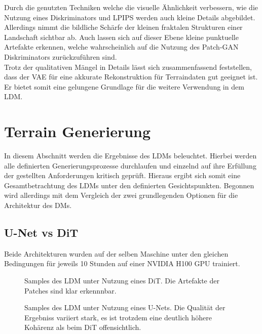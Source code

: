 Durch die genutzten Techniken welche die visuelle Ähnlichkeit verbessern, wie die Nutzung eines Diskriminators und LPIPS werden auch kleine Details abgebildet. Allerdings nimmt die bildliche Schärfe der kleinen fraktalen Strukturen einer Landschaft sichtbar ab. Auch lassen sich auf dieser Ebene kleine punktuelle Artefakte erkennen, welche wahrscheinlich auf die Nutzung des Patch-GAN Diskriminators zurückzuführen sind. \\
Trotz der qualitativen Mängel in Details lässt sich zusammenfassend feststellen, dass der VAE für eine akkurate Rekonstruktion für Terraindaten gut geeignet ist. Er bietet somit eine gelungene Grundlage für die weitere Verwendung in dem LDM.

\section {Terrain Generierung}

In diesem Abschnitt werden die Ergebnisse des LDMs beleuchtet. Hierbei werden alle definierten Generierungsprozesse durchlaufen und einzelnd auf ihre Erfüllung der gestellten Anforderungen kritisch geprüft. Hieraus ergibt sich somit eine Gesamtbetrachtung des LDMs unter den definierten Gesichtspunkten. Begonnen wird allerdings mit dem Vergleich der zwei grundlegenden Optionen für die Architektur des DMs. 


\subsection {U-Net vs DiT}

Beide Architekturen wurden auf der selben Maschine unter den gleichen Bedingungen für jeweils 10 Stunden auf einer NVIDIA H100 GPU trainiert. 

\begin{figure}[htbp]
    \centering
    \caption{Samples des LDM unter Nutzung eines DiT. Die Artefakte der Patches sind klar erkennnbar.}
    \label{fig:dit_results}
\end{figure}


\begin{figure}[htbp]
    \centering
    \caption{Samples des LDM unter Nutzung eines U-Nets. Die Qualität der Ergebniss variiert stark, es ist trotzdem eine deutlich höhere Kohärenz als beim DiT offensichtlich.}
    \label{fig:unet_results}
\end{figure}


